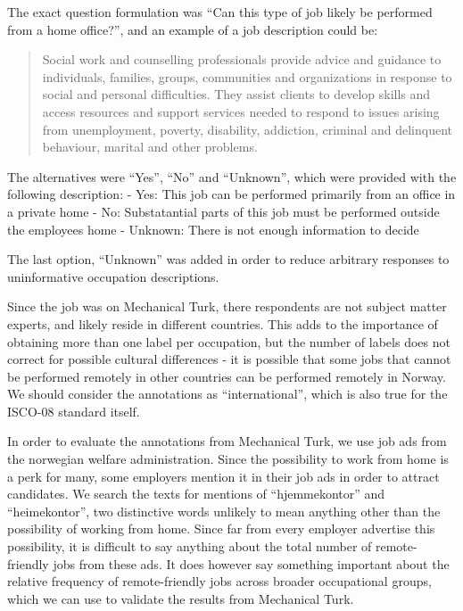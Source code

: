 \documentclass[11pt,]{article}
\begin{document}
The exact question formulation was ``Can this type of job likely be
performed from a home office?'', and an example of a job description
could be:

\begin{quote}
Social work and counselling professionals provide advice and guidance to
individuals, families, groups, communities and organizations in response
to social and personal difficulties. They assist clients to develop
skills and access resources and support services needed to respond to
issues arising from unemployment, poverty, disability, addiction,
criminal and delinquent behaviour, marital and other problems.
\end{quote}

The alternatives were ``Yes'', ``No'' and ``Unknown'', which were
provided with the following description: - Yes: This job can be
performed primarily from an office in a private home - No: Substatantial
parts of this job must be performed outside the employees home -
Unknown: There is not enough information to decide

The last option, ``Unknown'' was added in order to reduce arbitrary
responses to uninformative occupation descriptions.

Since the job was on Mechanical Turk, there respondents are not subject
matter experts, and likely reside in different countries. This adds to
the importance of obtaining more than one label per occupation, but the
number of labels does not correct for possible cultural differences - it
is possible that some jobs that cannot be performed remotely in other
countries can be performed remotely in Norway. We should consider the
annotations as ``international'', which is also true for the ISCO-08
standard itself.

In order to evaluate the annotations from Mechanical Turk, we use job
ads from the norwegian welfare administration. Since the possibility to
work from home is a perk for many, some employers mention it in their
job ads in order to attract candidates. We search the texts for mentions
of ``hjemmekontor'' and ``heimekontor'', two distinctive words unlikely
to mean anything other than the possibility of working from home. Since
far from every employer advertise this possibility, it is difficult to
say anything about the total number of remote-friendly jobs from these
ads. It does however say something important about the relative
frequency of remote-friendly jobs across broader occupational groups,
which we can use to validate the results from Mechanical Turk.
\end{document}
